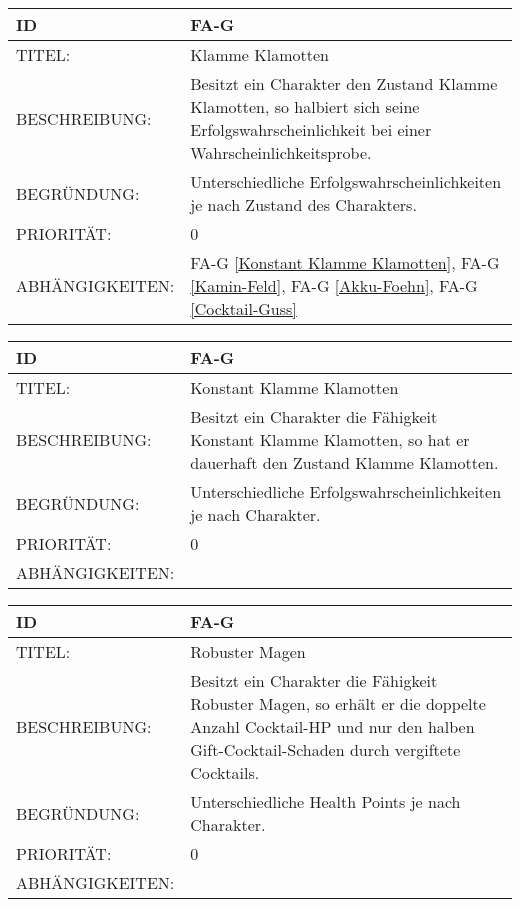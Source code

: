 \begin{tabularx}{16cm}{l|X}
	{table}\label{Klamme Klamotten}
	\textbf{ID} & \textbf{FA-G \arabic{table}} \\
	\hline
	TITEL: & Klamme Klamotten \\
	\hline
	BESCHREIBUNG: & Besitzt ein Charakter den Zustand Klamme Klamotten, so halbiert sich seine Erfolgswahrscheinlichkeit bei einer Wahrscheinlichkeitsprobe. \\
	\hline
	BEGRÜNDUNG: & Unterschiedliche Erfolgswahrscheinlichkeiten je nach Zustand des Charakters.\\
	\hline
	PRIORITÄT: & 0\\
	\hline
	ABHÄNGIGKEITEN: & FA-G \ref{Konstant Klamme Klamotten}, FA-G \ref{Kamin-Feld}, FA-G \ref{Akku-Foehn},  FA-G \ref{Cocktail-Guss}\\
\end{tabularx}

\begin{tabularx}{16cm}{l|X}
	{table}\label{Konstant Klamme Klamotten}
	\textbf{ID} & \textbf{FA-G \arabic{table}} \\
	\hline
	TITEL: & Konstant Klamme Klamotten \\
	\hline
	BESCHREIBUNG: & Besitzt ein Charakter die Fähigkeit Konstant Klamme Klamotten, so hat er dauerhaft den Zustand Klamme Klamotten.\\
	\hline
	BEGRÜNDUNG: & Unterschiedliche Erfolgswahrscheinlichkeiten je nach Charakter.\\
	\hline
	PRIORITÄT: & 0\\
	\hline
	ABHÄNGIGKEITEN: & \\
\end{tabularx}

\begin{tabularx}{16cm}{l|X}
	{table}\label{Robuster Magen}
	\textbf{ID} & \textbf{FA-G \arabic{table}} \\
	\hline
	TITEL: & Robuster Magen \\
	\hline
	BESCHREIBUNG: & Besitzt ein Charakter die Fähigkeit Robuster Magen, so erhält er die doppelte Anzahl Cocktail-HP und nur den halben Gift-Cocktail-Schaden durch vergiftete Cocktails.\\
	\hline
	BEGRÜNDUNG: & Unterschiedliche Health Points je nach Charakter.\\
	\hline
	PRIORITÄT: & 0\\
	\hline
	ABHÄNGIGKEITEN: & \\
\end{tabularx}

